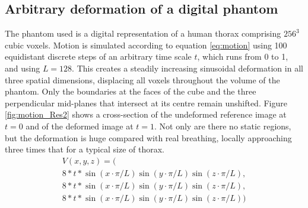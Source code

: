 \subsection{Arbitrary deformation of a digital phantom}

The phantom used is a digital representation\cite{xcatweb} of a human thorax comprising $256^3$ cubic voxels.  Motion is simulated according to equation \ref{eq:motion} using 100 equidistant discrete steps of an arbitrary time scale $t$, which runs from 0 to 1, and using $L=128$.  This creates a steadily increasing sinusoidal deformation in all three spatial dimensions, displacing all voxels throughout the volume of the phantom.  Only the boundaries at the faces of the cube and the three perpendicular mid-planes that intersect at its centre remain unshifted.  Figure \ref{fig:motion_Res2} shows a cross-section of the undeformed reference image at $t=0$ and of the deformed image at $t=1$.  Not only are there no static regions, but the deformation is huge compared with real breathing\cite{Liu2007531}, locally approaching three times that for a typical size of thorax.
\begin{eqnarray}
V(x,y,z) = \bigl(\nonumber\\
8*t*\sin(x \cdot \pi/L)\sin(y \cdot \pi/L)\sin(z \cdot \pi/L),\nonumber \\
8*t*\sin(x \cdot \pi/L)\sin(y \cdot \pi/L)\sin(z \cdot \pi/L),\nonumber\\
8*t*\sin(x \cdot \pi/L)\sin(y \cdot \pi/L)\sin(z \cdot \pi/L)\bigr)
\label{eq:motion}
\end{eqnarray}



